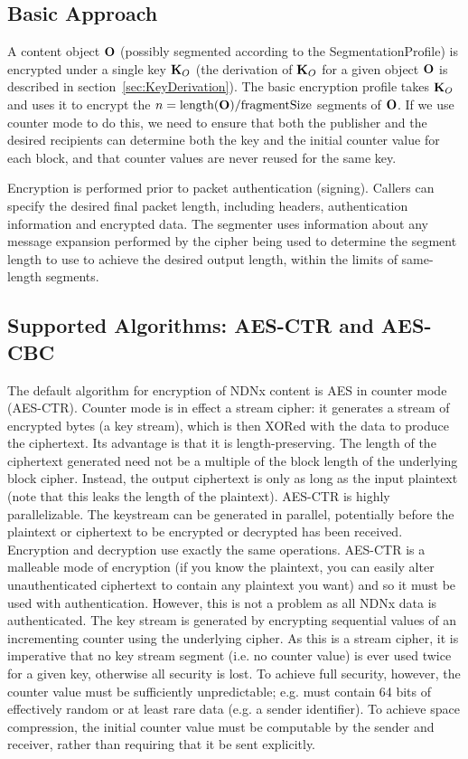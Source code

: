 \subsection{Basic Approach}

A content object ${\textbf{O}}$ (possibly segmented according to the
SegmentationProfile) is encrypted under a single key ${\textbf{K}_O}$ (the
derivation of ${\textbf{K}_O}$ for a given object ${\textbf{O}}$ is described in
section~\ref{sec:KeyDerivation}). The basic encryption profile takes
${\textbf{K}_O}$ and uses it to encrypt the
$n=\mbox{length}({\textbf{O}})/\mbox{fragmentSize}$ segments of ${\textbf{O}}$. If we
use counter mode to do this, we need to ensure that both the publisher
and the desired recipients can determine both the key and the initial
counter value for each block, and that counter values are never reused
for the same key.

Encryption is performed prior to packet authentication
(signing). Callers can specify the desired final packet length,
including headers, authentication information and encrypted data. The
segmenter uses information about any message expansion performed by
the cipher being used to determine the segment length to use to
achieve the desired output length, within the limits of same-length
segments.


\subsection{Supported Algorithms: AES-CTR and AES-CBC}

The default algorithm for encryption of NDNx content is AES in counter
mode (AES-CTR). Counter mode is in effect a stream cipher: it
generates a stream of encrypted bytes (a key stream), which is then
XORed with the data to produce the ciphertext. Its advantage is that
it is length-preserving. The length of the ciphertext generated need
not be a multiple of the block length of the underlying block
cipher. Instead, the output ciphertext is only as long as the input
plaintext (note that this leaks the length of the plaintext). AES-CTR
is highly parallelizable. The keystream can be generated in parallel,
potentially before the plaintext or ciphertext to be encrypted or
decrypted has been received. Encryption and decryption use exactly the
same operations. AES-CTR is a malleable mode of encryption (if you
know the plaintext, you can easily alter unauthenticated ciphertext to
contain any plaintext you want) and so it must be used with
authentication. However, this is not a problem as all NDNx data is
authenticated. The key stream is generated by encrypting sequential
values of an incrementing counter using the underlying cipher. As this
is a stream cipher, it is imperative that no key stream segment
(i.e. no counter value) is ever used twice for a given key, otherwise
all security is lost. To achieve full security, however, the counter
value must be sufficiently unpredictable; e.g. must contain 64 bits of
effectively random or at least rare data (e.g. a sender
identifier). To achieve space compression, the initial counter value
must be computable by the sender and receiver, rather than requiring
that it be sent explicitly.

